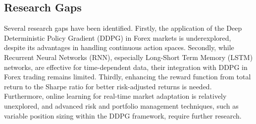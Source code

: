 \subsection{Research Gaps}

Several research gaps have been identified. Firstly, the application of the Deep Deterministic Policy Gradient (DDPG) in Forex markets is underexplored, despite its advantages in handling continuous action spaces. Secondly, while Recurrent Neural Networks (RNN), especially Long-Short Term Memory (LSTM) networks, are effective for time-dependent data, their integration with DDPG in Forex trading remains limited. Thirdly, enhancing the reward function from total return to the Sharpe ratio for better risk-adjusted returns is needed. Furthermore, online learning for real-time market adaptation is relatively unexplored, and advanced risk and portfolio management techniques, such as variable position sizing within the DDPG framework, require further research.